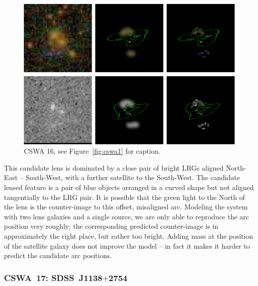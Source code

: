 \documentclass[iop]{emulateapj}
\begin{document}
\begin{figure}[!ht]
	\centering\includegraphics[width=\linewidth]{figs/16.eps}
	\caption{CSWA 16, see Figure~\ref{fig:cswa1} for caption.}
	\label{fig:cswa16}
\end{figure}

This candidate lens is dominated by a close pair of bright LRGs aligned
North-East -- South-West, with a further satellite to the South-West. The
candidate lensed feature is a pair of blue objects arranged in a curved shape
but not aligned tangentially to the LRG pair. It is possible that the green
light to the North of the lens is the counter-image to this offset, misaligned
arc. Modeling the system with two lens galaxies and a single source, we are only
able to reproduce the arc position very roughly: the corresponding  predicted
counter-image is in approximately the right place, but rather too bright. Adding
mass at the position of the satellite galaxy does not improve the model -- in
fact it makes it harder to predict the candidate arc positions.



\subsubsection*{CSWA~17: SDSS\ J1138$+$2754}
\label{sec:results:indinotes:cswa17}

\end{document}
